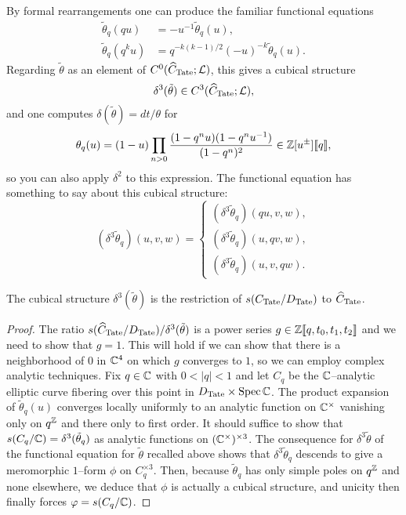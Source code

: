 By formal rearrangements one can produce the familiar functional equations
\begin{align*}
\tilde \theta_q(qu) & = -u^{-1} \tilde\theta_q(u), \\
\tilde \theta_q(q^k u) & = q^{-k(k-1)/2} (-u)^{-k} \tilde\theta_q(u).
\end{align*}
Regarding $\tilde\theta$ as an element of $C^0(\widehat C_{\mathrm{Tate}}; \mathcal{L})$, this gives a cubical structure \[\delta^3(\tilde\theta) \in C^3(\widehat C_{\mathrm{Tate}}; \mathcal{L}),\] and one computes $\delta(\tilde\theta) = dt/\theta$ for \[\theta_q(u) = (1 - u) \prod_{n > 0} \frac{(1 - q^nu)(1 - q^n u^{-1})}{(1 - q^n)^2} \in \mathbb Z[u^\pm]\llbracket q \rrbracket,\] so you can also apply $\delta^2$ to this expression.  The functional equation has something to say about this cubical structure: \[(\delta^3 \tilde\theta_q)(u, v, w) = \begin{cases} (\delta^3 \tilde\theta_q)(qu, v, w), \\ (\delta^3 \tilde\theta_q)(u, qv, w), \\ (\delta^3 \tilde\theta_q)(u, v, qw). \end{cases}\]

\begin{theorem}
The cubical structure $\delta^3(\tilde \theta)$ is the restriction of $s(C_{\mathrm{Tate}} / D_{\mathrm{Tate}})$ to $\widehat C_{\mathrm{Tate}}$.
\end{theorem}
\begin{proof}
The ratio $s(\widehat C_{\mathrm{Tate}} / D_{\mathrm{Tate}}) / \delta^3(\tilde\theta)$ is a power series $g \in \mathbb Z\llbracket q, t_0, t_1, t_2\rrbracket$ and we need to show that $g = 1$.  This will hold if we can show that there is a neighborhood of $0$ in $\mathbb{C}^4$ on which $g$ converges to $1$, so we can employ complex analytic techniques.  Fix $q \in \mathbb{C}$ with $0 < |q| < 1$ and let $C_q$ be the $\mathbb{C}$--analytic elliptic curve fibering over this point in $D_{\mathrm{Tate}} \times \operatorname{Spec} \mathbb{C}$.  The product expansion of $\tilde\theta_q(u)$ converges locally uniformly to an analytic function on $\mathbb{C}^\times$ vanishing only on $q^{\mathbb Z}$ and there only to first order.  It should suffice to show that $s(C_q/\mathbb{C}) = \delta^3(\tilde\theta_q)$ as analytic functions on $(\mathbb{C}^\times)^{\times 3}$.  The consequence for $\delta^3 \tilde\theta$ of the functional equation for $\tilde\theta$ recalled above shows that $\delta^3\tilde\theta_q$ descends to give a meromorphic $1$--form $\phi$ on $C_q^{\times 3}$.  Then, because $\tilde\theta_q$ has only simple poles on $q^{\mathbb Z}$ and none elsewhere, we deduce that $\phi$ is actually a cubical structure, and unicity then finally forces $\varphi = s(C_q / \mathbb{C})$.
\end{proof}

